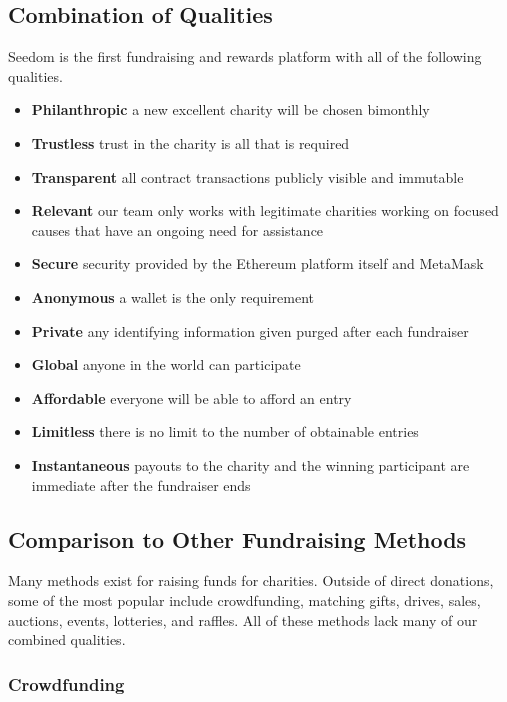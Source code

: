 \documentclass[11pt]{article}
\begin{document}
\subsection{Combination of Qualities}

Seedom is the first fundraising and rewards platform with all of the following qualities.

\begin{itemize}
\item{\textbf{Philanthropic} a new excellent charity will be chosen bimonthly}
\item{\textbf{Trustless} trust in the charity is all that is required}
\item{\textbf{Transparent} all contract transactions publicly visible and immutable}
\item{\textbf{Relevant} our team only works with legitimate charities working on focused causes that have an ongoing need for assistance}
\item{\textbf{Secure} security provided by the Ethereum platform itself and MetaMask}
\item{\textbf{Anonymous} a wallet is the only requirement}
\item{\textbf{Private} any identifying information given purged after each fundraiser}
\item{\textbf{Global} anyone in the world can participate}
\item{\textbf{Affordable} everyone will be able to afford an entry}
\item{\textbf{Limitless} there is no limit to the number of obtainable entries}
\item{\textbf{Instantaneous} payouts to the charity and the winning participant are immediate after the fundraiser ends}
\end{itemize}

\subsection{Comparison to Other Fundraising Methods}

Many methods exist for raising funds for charities. Outside of direct donations, some of the most popular include crowdfunding, matching gifts, drives, sales, auctions, events, lotteries, and raffles. All of these methods lack many of our combined qualities.

\subsubsection{Crowdfunding}
\end{document}
